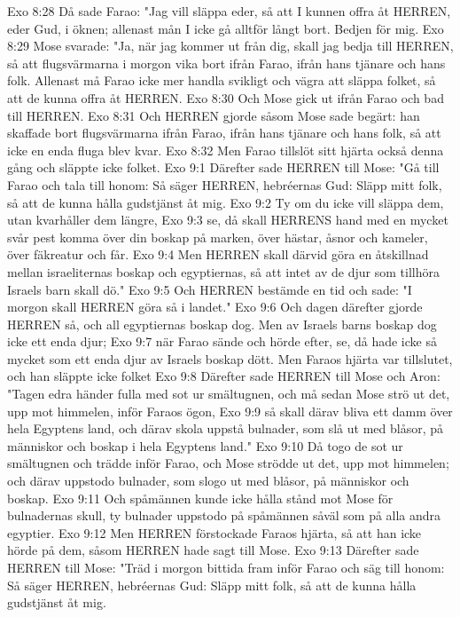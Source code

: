 Exo 8:28  Då sade Farao: "Jag vill släppa eder, så att I kunnen offra åt HERREN, eder Gud, i öknen; allenast mån I icke gå alltför långt bort. Bedjen för mig.
Exo 8:29  Mose svarade: "Ja, när jag kommer ut från dig, skall jag bedja till HERREN, så att flugsvärmarna i morgon vika bort ifrån Farao, ifrån hans tjänare och hans folk. Allenast må Farao icke mer handla svikligt och vägra att släppa folket, så att de kunna offra åt HERREN.
Exo 8:30  Och Mose gick ut ifrån Farao och bad till HERREN.
Exo 8:31  Och HERREN gjorde såsom Mose sade begärt: han skaffade bort flugsvärmarna ifrån Farao, ifrån hans tjänare och hans folk, så att icke en enda fluga blev kvar.
Exo 8:32  Men Farao tillslöt sitt hjärta också denna gång och släppte icke folket.
Exo 9:1  Därefter sade HERREN till Mose: "Gå till Farao och tala till honom: Så säger HERREN, hebréernas Gud: Släpp mitt folk, så att de kunna hålla gudstjänst åt mig.
Exo 9:2  Ty om du icke vill släppa dem, utan kvarhåller dem längre,
Exo 9:3  se, då skall HERRENS hand med en mycket svår pest komma över din boskap på marken, över hästar, åsnor och kameler, över fäkreatur och får.
Exo 9:4  Men HERREN skall därvid göra en åtskillnad mellan israeliternas boskap och egyptiernas, så att intet av de djur som tillhöra Israels barn skall dö."
Exo 9:5  Och HERREN bestämde en tid och sade: "I morgon skall HERREN göra så i landet."
Exo 9:6  Och dagen därefter gjorde HERREN så, och all egyptiernas boskap dog. Men av Israels barns boskap dog icke ett enda djur;
Exo 9:7  när Farao sände och hörde efter, se, då hade icke så mycket som ett enda djur av Israels boskap dött. Men Faraos hjärta var tillslutet, och han släppte icke folket
Exo 9:8  Därefter sade HERREN till Mose och Aron: "Tagen edra händer fulla med sot ur smältugnen, och må sedan Mose strö ut det, upp mot himmelen, inför Faraos ögon,
Exo 9:9  så skall därav bliva ett damm över hela Egyptens land, och därav skola uppstå bulnader, som slå ut med blåsor, på människor och boskap i hela Egyptens land."
Exo 9:10  Då togo de sot ur smältugnen och trädde inför Farao, och Mose strödde ut det, upp mot himmelen; och därav uppstodo bulnader, som slogo ut med blåsor, på människor och boskap.
Exo 9:11  Och spåmännen kunde icke hålla stånd mot Mose för bulnadernas skull, ty bulnader uppstodo på spåmännen såväl som på alla andra egyptier.
Exo 9:12  Men HERREN förstockade Faraos hjärta, så att han icke hörde på dem, såsom HERREN hade sagt till Mose.
Exo 9:13  Därefter sade HERREN till Mose: "Träd i morgon bittida fram inför Farao och säg till honom: Så säger HERREN, hebréernas Gud: Släpp mitt folk, så att de kunna hålla gudstjänst åt mig.
